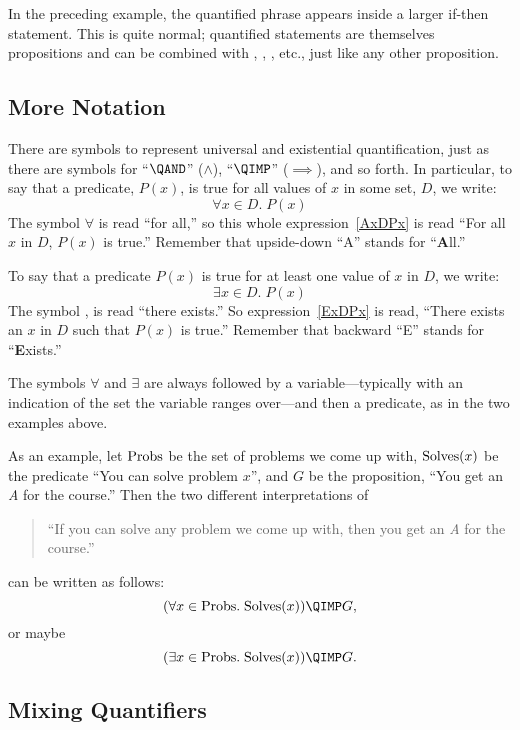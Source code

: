 In the preceding example, the quantified phrase appears inside a
larger if-then statement.  This is quite normal; quantified statements
are themselves propositions and can be combined with \QAND, \QOR,
\QIMPLIES, etc., just like any other proposition.

\subsection{More Notation}

There are symbols to represent universal and existential
quantification, just as there are symbols for ``$\QAND$'' ($\wedge$),
``$\QIMP$'' ($\implies$), and so forth.  In particular, to say
that a predicate, $P(x)$, is true for all values of $x$ in some set,
$D$, we write:
\begin{equation}\label{AxDPx}
\forall x \in D.\; P(x)
\end{equation}
The  symbol $\forall$ is read ``for all,''
so this whole expression~\eqref{AxDPx} is read ``For all $x$ in $D$,
$P(x)$ is true.''  Remember that upside-down ``A'' stands for
``\textbf{A}ll.''

To say that a predicate $P(x)$ is true for at least one value of $x$
in $D$, we write:
\begin{equation}\label{ExDPx}
\exists x \in D.\; P(x)
\end{equation}
The  symbol \term{$\exists$}, is read
``there exists.''  So expression~\eqref{ExDPx} is read, ``There exists
an $x$ in $D$ such that $P(x)$ is true.''  Remember that backward
``E'' stands for ``\textbf{E}xists.''

The symbols $\forall$ and $\exists$ are always followed by a
variable---typically with an indication of the set the variable ranges
over---and then a predicate, as in the two examples above.

As an example, let $\text{Probs}$ be the set of problems we come up with,
$\text{Solves}(x)$ be the predicate ``You can solve problem $x$'', and $G$ be
the proposition, ``You get an \emph{A} for the course.''  Then the two
different interpretations of
%
\begin{quote}
  ``If you can solve any problem we come up with, then you get an \emph{A}
  for the course.''
\end{quote}
can be written as follows:
\[
(\forall x \in \probs.\; \solves(x)) \QIMP G,
\]
or maybe
\[
(\exists x \in \probs.\; \solves(x)) \QIMP G.
\]

\subsection{Mixing Quantifiers}

